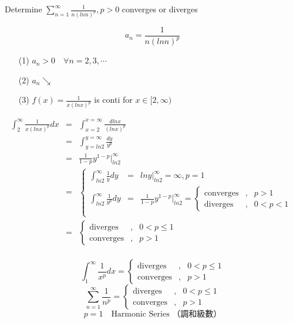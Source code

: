 \begin{eg}
Determine \(\displaystyle \sum^{\infty}_{n =1} \frac{1}{n(ln n)^p}, p > 0\) converges or diverges

\soln
\[\displaystyle a_n = \frac{1}{n(ln n)^p}\]
\begin{itemize}
\item[(1)] \(a_n > 0 \quad \forall n = 2, 3, \cdots\)
\item[(2)] \(a_n \searrow\)
\item[(3)] \(\displaystyle f(x) = \frac{1}{x(ln x)^p}\) is conti for \(x \in [2, \infty)\)
\end{itemize}
\[\begin{array}{rcl}
\displaystyle \int^{\infty}_2 \frac{1}{x(ln x)^p} dx & = & \displaystyle \int^{x = \infty}_{x = 2} \frac{d lnx}{(lnx)^p}\\
& = & \displaystyle \int^{y = \infty}_{y = ln 2} \frac{dy}{y^p}\\
& = & \displaystyle \frac{1}{1 - p} y ^{1 - p} \Big|^{\infty}_{ln 2}\\
& = & \left\{\begin{array}{rcl}
\displaystyle \int^{\infty}_{ln2} \frac{1}{y} dy & = & lny \Big|^{\infty}_{ln2} = \infty, p = 1\\
\displaystyle \int^{\infty}_{ln2} \frac{1}{y^p} dy & = & \displaystyle \frac{1}{1 - p} y^{1 - p} \Big|^{\infty}_{ln2} = \left\{\begin{array}{ccl}
\text{converges} & , & p> 1\\
\text{diverges} & , & 0 < p < 1
\end{array} \right.\\
\end{array} \right.\\
& = & \left\{\begin{array}{ccl}
\text{diverges} & , & 0 < p \leq 1\\
\text{converges} & , & p >1
\end{array} \right.\\
\end{array}\]
\end{eg}
\begin{notn}
\[\displaystyle \int^{\infty}_1 \frac{1}{x^p} dx = \left\{ \begin{array}{ccl} \text{diverges} &, & 0 < p \leq 1\\
\text{converges} &, & p > 1 
\end{array}\right.\]
\[\displaystyle \sum^{\infty}_{n = 1} \frac{1}{n^p} = \left\{\begin{array}{ccl}
\text{diverges} &, & 0 < p \leq 1\\
\text{converges} &, & p > 1
\end{array} \right.\]
\[p = 1 \quad \text{Harmonic Series （調和級數）}\]
\end{notn}
